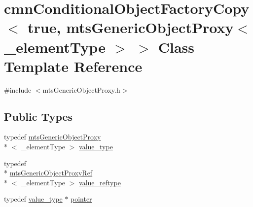 \hypertarget{classcmn_conditional_object_factory_copy_3_01true_00_01mts_generic_object_proxy_3_01__element_type_01_4_01_4}{\section{cmn\-Conditional\-Object\-Factory\-Copy$<$ true, mts\-Generic\-Object\-Proxy$<$ \-\_\-element\-Type $>$ $>$ Class Template Reference}
\label{classcmn_conditional_object_factory_copy_3_01true_00_01mts_generic_object_proxy_3_01__element_type_01_4_01_4}
}


{\ttfamily \#include $<$mts\-Generic\-Object\-Proxy.\-h$>$}

\subsection*{Public Types}
\begin{DoxyCompactItemize}
\item 
typedef \hyperlink{classmts_generic_object_proxy}{mts\-Generic\-Object\-Proxy}\\*
$<$ \-\_\-element\-Type $>$ \hyperlink{classcmn_conditional_object_factory_copy_3_01true_00_01mts_generic_object_proxy_3_01__element_type_01_4_01_4_a206702e54ea83f096833f3e28fe87a7d}{value\-\_\-type}
\item 
typedef \\*
\hyperlink{classmts_generic_object_proxy_ref}{mts\-Generic\-Object\-Proxy\-Ref}\\*
$<$ \-\_\-element\-Type $>$ \hyperlink{classcmn_conditional_object_factory_copy_3_01true_00_01mts_generic_object_proxy_3_01__element_type_01_4_01_4_ae3b76e4662e4828ea5f57f42bb46a35b}{value\-\_\-reftype}
\item 
typedef \hyperlink{classcmn_conditional_object_factory_copy_3_01true_00_01mts_generic_object_proxy_3_01__element_type_01_4_01_4_a206702e54ea83f096833f3e28fe87a7d}{value\-\_\-type} $\ast$ \hyperlink{classcmn_conditional_object_factory_copy_3_01true_00_01mts_generic_object_proxy_3_01__element_type_01_4_01_4_a00518536863dfeebbba5ece74e4b2303}{pointer}
\end{DoxyCompactItemize}
